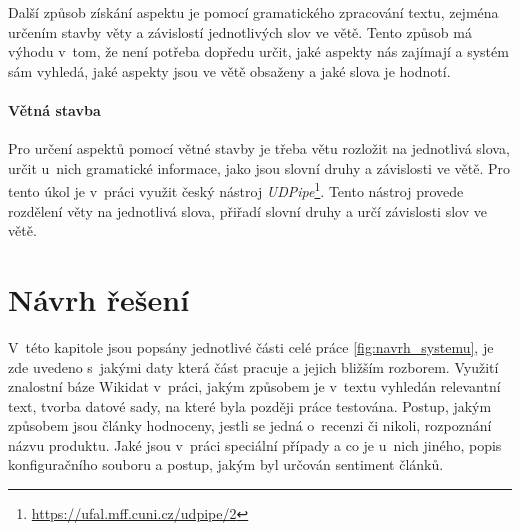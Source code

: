 Další způsob získání aspektu je pomocí gramatického zpracování textu, zejména určením stavby věty a závislostí jednotlivých slov ve větě. Tento způsob má výhodu v~tom, že není potřeba dopředu určit, jaké aspekty nás zajímají a systém sám vyhledá, jaké aspekty jsou ve větě obsaženy a jaké slova je hodnotí\cite{chockalingam2018}.

\subsubsection*{Větná stavba}
Pro určení aspektů pomocí větné stavby je třeba větu rozložit na jednotlivá slova, určit u~nich gramatické informace, jako jsou slovní druhy a závislosti ve větě. Pro tento úkol je v~práci využit český nástroj \textit{UDPipe}\footnote{\url{https://ufal.mff.cuni.cz/udpipe/2}}. Tento nástroj provede rozdělení věty na jednotlivá slova, přiřadí slovní druhy a určí závislosti slov ve větě. 

\chapter{Návrh řešení}
\label{navrh_reseni}
V~této kapitole jsou popsány jednotlivé části celé práce \ref{fig:navrh_systemu}, je zde uvedeno s~jakými daty která část pracuje a jejich bližším rozborem. Využití znalostní báze Wikidat v~práci, jakým způsobem je v~textu vyhledán relevantní text, tvorba datové sady, na které byla později práce testována. Postup, jakým způsobem jsou články hodnoceny, jestli se jedná o~recenzi či nikoli, rozpoznání názvu produktu. Jaké jsou v~práci speciální případy a co je u~nich jiného, popis konfiguračního souboru a postup, jakým byl určován sentiment článků.

